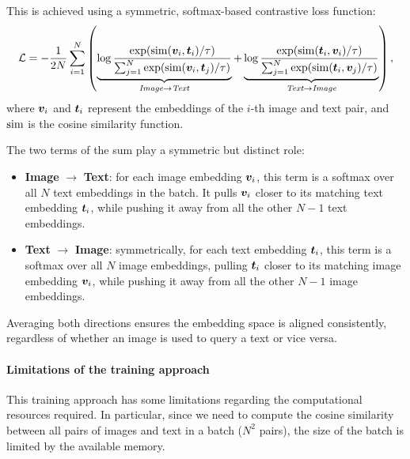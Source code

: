 This is achieved using a symmetric, softmax-based contrastive loss function:
\begin{equation}
    \mathcal{L} = -\frac{1}{2N} \sum_{i=1}^{N} \left(
    \underbrace{\log \frac{\exp(\operatorname{sim}(\boldsymbol{v}_i, \boldsymbol{t}_i) / \tau)}{\sum_{j=1}^{N} \exp(\operatorname{sim}(\boldsymbol{v}_i, \boldsymbol{t}_j) / \tau)}}_{\textit{Image} \to \textit{Text}}
    +
    \underbrace{\log \frac{\exp(\operatorname{sim}(\boldsymbol{t}_i, \boldsymbol{v}_i) / \tau)}{\sum_{j=1}^{N} \exp(\operatorname{sim}(\boldsymbol{t}_i, \boldsymbol{v}_j) / \tau)}}_{\textit{Text} \to \textit{Image}}\right),
\end{equation}
where $\boldsymbol{v}_i$ and $\boldsymbol{t}_i$ represent the embeddings of the $i$-th image and text pair, and $\operatorname{sim}$ is the cosine similarity function.

The two terms of the sum play a symmetric but distinct role:
\begin{itemize}
    \item \textbf{Image} $\to$ \textbf{Text}: for each image embedding $\boldsymbol{v}_i$, this term is a softmax over all $N$ text embeddings in the batch. It pulls $\boldsymbol{v}_i$ closer to its matching text embedding $\boldsymbol{t}_i$, while pushing it away from all the other $N-1$ text embeddings.
    \item \textbf{Text} $\to$ \textbf{Image}: symmetrically, for each text embedding $\boldsymbol{t}_i$, this term is a softmax over all $N$ image embeddings, pulling $\boldsymbol{t}_i$ closer to its matching image embedding $\boldsymbol{v}_i$, while pushing it away from all the other $N-1$ image embeddings.
\end{itemize}
Averaging both directions ensures the embedding space is aligned consistently, regardless of whether an image is used to query a text or vice versa.



\paragraph{Limitations of the training approach}
\label{CLIP:training-limitations}
This training approach has some limitations regarding the computational resources required. 
In particular, since we need to compute the cosine similarity between all pairs of images and text in a batch ($N^2$ pairs),
the size of the batch is limited by the available memory.

